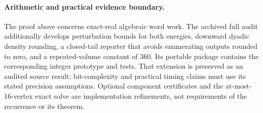 \paragraph{Arithmetic and practical evidence boundary.}
The proof above concerns exact-real algebraic word work. The archived full
audit additionally develops perturbation bounds for both energies, downward
dyadic density rounding, a closed-tail reporter that avoids enumerating
outputs rounded to zero, and a repeated-volume constant of 360. Its portable
package contains the corresponding integer prototype and tests. That extension
is preserved as an audited source result; bit-complexity and practical timing
claims must use its stated precision assumptions. Optional component
certificates and the at-most-16-vertex exact solve are implementation
refinements, not requirements of the recurrence or its theorem.
